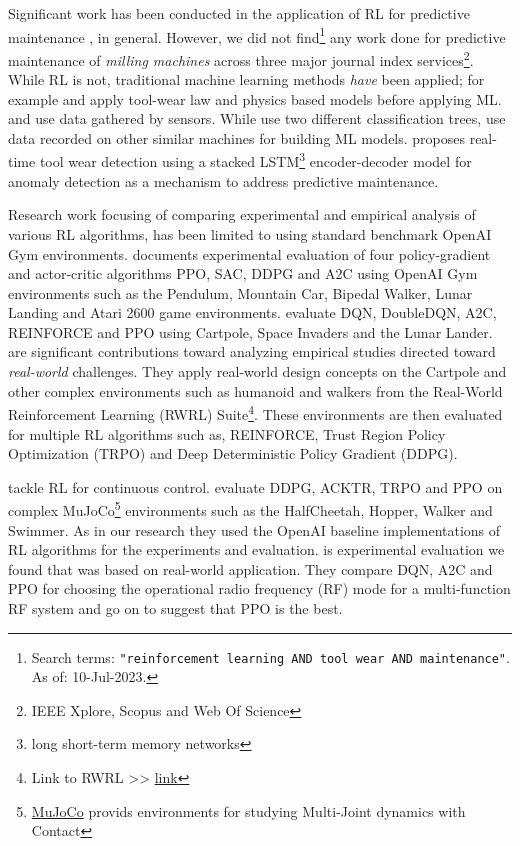 \documentclass[a4paper, 12pt]{article}
\begin{document}
Significant work has been conducted in the application of RL for predictive maintenance \citep{Panzer2021, Erhan2021, siraskar2023}, in general. However, we did not find\footnote{Search terms: \texttt{"reinforcement learning AND tool wear AND maintenance"}. As of: 10-Jul-2023.} any work done for predictive maintenance of \textit{milling machines} across three major journal index services\footnote{IEEE Xplore\texttrademark{}, Scopus\texttrademark{} and Web Of Science\texttrademark{}}. %
While RL is not, traditional machine learning methods \textit{have} been applied; for example \cite{Qin2023} and \cite{Qiang2023} apply tool-wear law and physics based models before applying ML. \cite{Twardowski2023} and \cite{Denkena2023} use data gathered by sensors. While \cite{Twardowski2023} use two different classification trees, \cite{Denkena2023} use data recorded on other similar machines for building ML models. \cite{oshida2023development} proposes real-time tool wear detection using a stacked LSTM\footnote{long short-term memory networks} encoder-decoder model for anomaly detection as a mechanism to address predictive maintenance.  

Research work focusing of comparing experimental and empirical analysis of various RL algorithms, has been limited to using standard benchmark OpenAI Gym environments. \cite{sandeep2022experimental} documents experimental evaluation of four policy-gradient and actor-critic algorithms PPO, SAC, DDPG and A2C using OpenAI Gym environments such as the Pendulum, Mountain Car, Bipedal Walker, Lunar Landing and Atari 2600 game environments. \cite{Krishna2020} evaluate DQN, DoubleDQN, A2C, REINFORCE and PPO using Cartpole, Space Invaders and the Lunar Lander. \cite{dulac2021, dulac2020empirical} are significant contributions toward analyzing empirical studies directed toward \textit{real-world} challenges. They apply real-world design concepts on the Cartpole and other complex environments such as humanoid and walkers from the Real-World Reinforcement Learning (RWRL) Suite\footnote{Link to RWRL >>   \href{https://github.com/google-research/realworldrl_suite}{link}}. These environments are then evaluated for multiple RL algorithms such as, REINFORCE, Trust Region Policy Optimization (TRPO) and Deep Deterministic Policy Gradient (DDPG). 

\cite{dulac2021, henderson2018deep} tackle RL for continuous control. \cite{henderson2018deep} evaluate DDPG, ACKTR, TRPO and PPO on complex MuJoCo\footnote{\href{https://mujoco.org/}{MuJoCo} provids environments for studying Multi-Joint dynamics with Contact} environments such as the HalfCheetah, Hopper, Walker and Swimmer. As in our research they used the OpenAI baseline implementations of RL algorithms for the experiments and evaluation. \cite{ford2022cognitive} is experimental evaluation we found that was based on real-world application. They compare DQN, A2C and PPO for choosing the operational radio frequency (RF) mode for a multi-function RF system and go on to suggest that PPO is the best.
\end{document}

